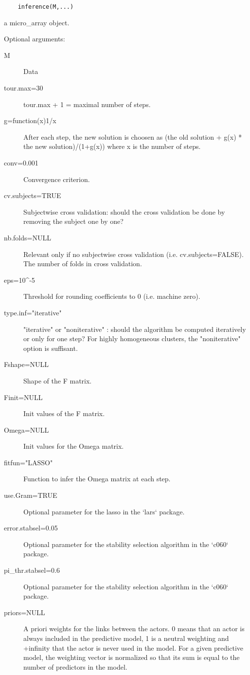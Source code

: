 \documentclass[a4paper]{book}
\begin{document}
%
\begin{Usage}
\begin{verbatim}
	inference(M,...)
\end{verbatim}
\end{Usage}
%
\begin{Arguments}
\begin{ldescription}
\item[\code{M}] a micro\_array object.
\item[\code{...}] Optional arguments: 	 
\begin{description}

\item[M] Data
\item[tour.max=30] tour.max + 1 = maximal number of steps.
\item[g=function(x)1/x] After each step, the new solution is choosen as (the old solution + g(x) * the new solution)/(1+g(x)) where x is the number of steps.
\item[conv=0.001] Convergence criterion.
\item[cv.subjects=TRUE] Subjectwise cross validation: should the cross validation be done by removing the subject one by one?
\item[nb.folds=NULL] Relevant only if no subjectwise cross validation (i.e. cv.subjects=FALSE). The number of folds in cross validation.
\item[eps=10\textasciicircum{}-5] Threshold for rounding coefficients to 0 (i.e. machine zero).
\item[type.inf="iterative"] "iterative" or "noniterative" : should the algorithm be computed iteratively or only for one step? For highly homogeneous clusters, the "noniterative" option is suffisant.
\item[Fshape=NULL] Shape of the F matrix.
\item[Finit=NULL] Init values of the F matrix.
\item[Omega=NULL] Init values for the Omega matrix.
\item[fitfun="LASSO"] Function to infer the Omega matrix at each step.
\item[use.Gram=TRUE] Optional parameter for the lasso in the `lars` package.
\item[error.stabsel=0.05] Optional parameter for the stability selection algorithm in the `c060` package.
\item[pi\_thr.stabsel=0.6] Optional parameter for the stability selection algorithm in the `c060` package.
\item[priors=NULL] A priori weights for the links between the actors. 0 means that an actor is always included in the predictive model, 1 is a neutral weighting and +infinity that the actor is never used in the model. For a given predictive model, the weighting vector is normalized so that its sum is equal to the number of predictors in the model.

\end{description}
\end{ldescription}
\end{Arguments}
\end{document}
